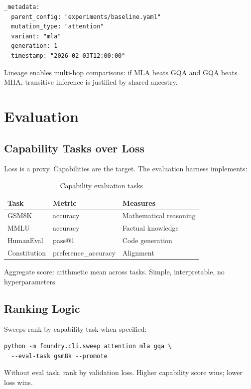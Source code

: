 \documentclass{article}
\begin{document}
\begin{lstlisting}
_metadata:
  parent_config: "experiments/baseline.yaml"
  mutation_type: "attention"
  variant: "mla"
  generation: 1
  timestamp: "2026-02-03T12:00:00"
\end{lstlisting}

Lineage enables multi-hop comparisons: if MLA beats GQA and GQA beats MHA, transitive inference is justified by shared ancestry.

\section{Evaluation}

\subsection{Capability Tasks over Loss}

Loss is a proxy. Capabilities are the target. The evaluation harness implements:

\begin{table}[h]
\centering
\begin{tabular}{lll}
\toprule
Task & Metric & Measures \\
\midrule
GSM8K & accuracy & Mathematical reasoning \\
MMLU & accuracy & Factual knowledge \\
HumanEval & pass@1 & Code generation \\
Constitution & preference\_accuracy & Alignment \\
\bottomrule
\end{tabular}
\caption{Capability evaluation tasks}
\end{table}

Aggregate score: arithmetic mean across tasks. Simple, interpretable, no hyperparameters.

\subsection{Ranking Logic}

Sweeps rank by capability task when specified:

\begin{lstlisting}
python -m foundry.cli.sweep attention mla gqa \
  --eval-task gsm8k --promote
\end{lstlisting}

Without eval task, rank by validation loss. Higher capability score wins; lower loss wins.
\end{document}
